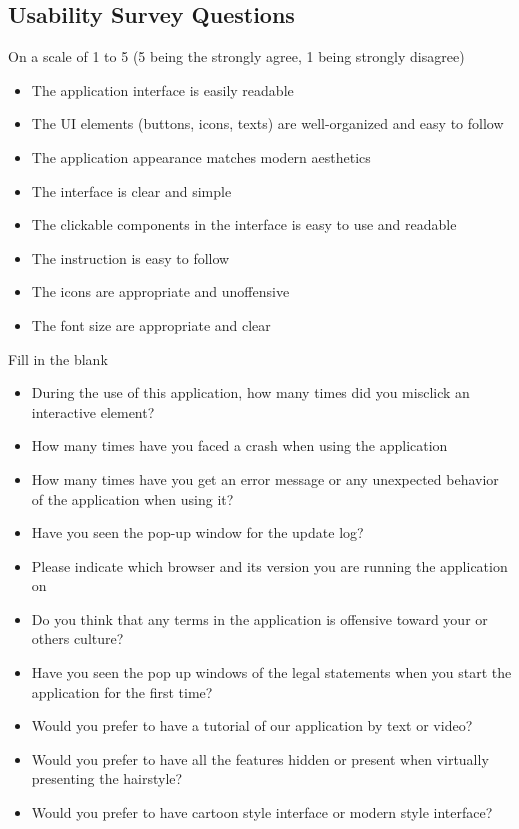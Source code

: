 \documentclass[12pt, titlepage]{article}
\begin{document}
\subsection{Usability Survey Questions}
\label{sec:survey}
On a scale of 1 to 5 (5 being the strongly agree, 1 being strongly disagree)
\begin{itemize}
    \item The application interface is easily readable
    \item The UI elements (buttons, icons, texts) are well-organized and easy to follow
    \item The application appearance matches modern aesthetics
    \item The interface is clear and simple
    \item The clickable components in the interface is easy to use and readable
    \item The instruction is easy to follow
    \item The icons are appropriate and unoffensive
    \item The font size are appropriate and clear
\end{itemize}
Fill in the blank
\begin{itemize}
    \item During the use of this application, how many times did you misclick an interactive element?
    \item How many times have you faced a crash when using the application
    \item How many times have you get an error message or any unexpected behavior of the application when using it?
    \item Have you seen the pop-up window for the update log?
    \item Please indicate which browser and its version you are running the application on
    \item Do you think that any terms in the application is offensive toward your or others culture?
    \item Have you seen the pop up windows of the legal statements when you start the application for the first time?
\end{itemize}
\begin{itemize}
    \item Would you prefer to have a tutorial of our application by text or video?
    \item Would you prefer to have all the features hidden or present when virtually presenting the hairstyle?
    \item Would you prefer to have cartoon style interface or modern style interface? 
\end{itemize}
\end{document}
